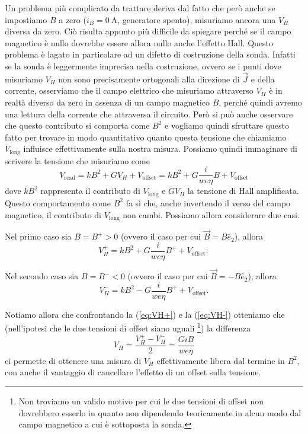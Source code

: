 \documentclass[
    prl,
    reprint, 
    superscriptaddress, 
    altaffilletter, 
    amsmath, 
    amssymb, 
    a4paper,
    varvw]{revtex4-2}
\begin{document}
Un problema più complicato da trattare deriva dal fatto che però anche se impostiamo $B$ a zero ($i_B=\SI{0}{\ampere}$, generatore spento), misuriamo ancora una $V_H$ diversa da zero. Ciò risulta appunto più difficile da spiegare perché se il campo magnetico è nullo dovrebbe essere allora nullo anche l'effetto Hall. Questo problema è lagato in particolare ad un difetto di costruzione della sonda. Infatti se la sonda è leggermente imprecisa nella costruzione, ovvero se i punti dove misuriamo $V_H$ non sono precisamente ortogonali alla direzione di $\vec{J}$ e della corrente, osserviamo che il campo elettrico che misuriamo attraverso $V_H$ è in realtà diverso da zero in assenza di un campo magnetico $B$, perché quindi avremo una lettura della corrente che attraversa il circuito. Però si può anche osservare che questo contributo si comporta come $B^2$ e vogliamo quindi sfruttare questo fatto per trovare in modo quantitativo quanto questa tensione che chiamiamo $V_\text{long}$ influisce effettivamente sulla nostra misura. 
Possiamo quindi immaginare di scrivere la tensione che misuriamo come \begin{equation}
    V_\text{read} = kB^2 +  GV_H + V_\text{offset} = kB^2 + G\frac{i}{we\eta}B + V_\text{offset}\label{eq:full_fit}
\end{equation}
dove $kB^2$ rappresenta il contributo di $V_\text{long}$ e $GV_H$ la tensione di Hall amplificata.
Questo comportamento come $B^2$ fa sì che, anche invertendo il verso del campo magnetico, il contributo di $V_\text{long}$ non cambi.
Possiamo allora considerare due casi. 

Nel primo caso sia $B=B^+>0$ (ovvero il caso per cui $\vec{B} = B\hat{e}_2$), allora \begin{equation}
    V_H^+ = kB^2 + G\frac{i}{we\eta}B^+ + V_\text{offset};\label{eq:VH+}
\end{equation}

Nel secondo caso sia $B=B^-<0$ (ovvero il caso per cui $\vec{B} = -B\hat{e}_2$), allora \begin{equation}
    V_H^- = kB^2 - G\frac{i}{we\eta}B^+ + V_\text{offset}.\label{eq:VH-}
\end{equation}

Notiamo allora che confrontando la (\ref{eq:VH+}) e la (\ref{eq:VH-}) otteniamo che (nell'ipotesi che le due tensioni di offset siano uguali \footnote{Non troviamo un valido motivo per cui le due tensioni di offset non dovrebbero esserlo in quanto non dipendendo teoricamente in alcun modo dal campo magnetico a cui è sottoposta la sonda.}) la differenza \begin{equation}
    V_H = \frac{V_H^+ - V_H^-}{2} = \frac{GiB}{we\eta}\label{eq:model_fit}
\end{equation} ci permette di ottenere una misura di $V_H$ effettivamente libera dal termine in $B^2$, con anche il vantaggio di cancellare l'effetto di un offset sulla tensione.
\end{document}
